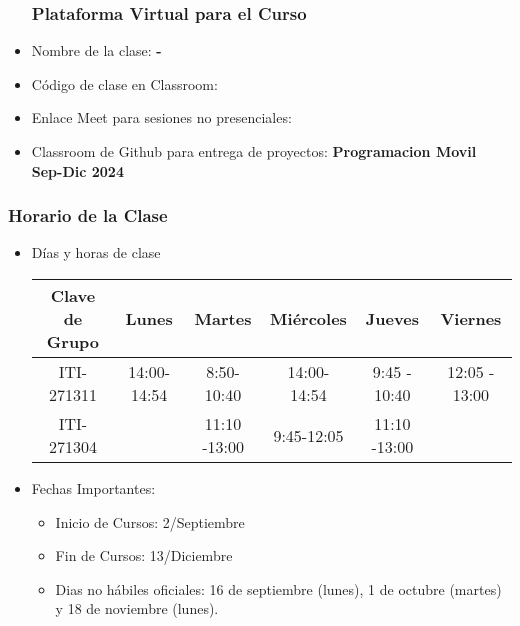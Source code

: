 



\begin{frame}
\begin{itemize}
\frametitle{Plataforma Virtual para el Curso}
\item Nombre de la clase: \textbf{\nombreMateria - \cuatrimestre}
\item Código de clase en Classroom: \textbf{\claveClassroom}
\item Enlace Meet para sesiones no presenciales: \textbf{\claveMeet}
\item Classroom de Github para entrega de proyectos: \textbf{Programacion Movil Sep-Dic 2024}
\end{itemize}

\end{frame}


\begin{frame}
\frametitle{Horario de la Clase}


\begin{itemize}
\item Días y horas de clase
\tiny
\begin{spacing}{1.0}
\begin{center}
\begin{tabular}{c|ccccc}
\hline 
\textbf{Clave de Grupo}   & Lunes        & Martes       & Miércoles    & Jueves         & Viernes         \\  \hline 
ITI-271311                & 14:00- 14:54 &  8:50- 10:40 & 14:00-14:54  &  9:45 - 10:40  & 12:05 - 13:00  \\
ITI-271304                &              & 11:10 -13:00 &  9:45-12:05  &  11:10 -13:00  &                \\      
\hline
\end{tabular}
\end{center}
\end{spacing}
\normalsize
\item Fechas Importantes:
\begin{itemize}
\item Inicio de Cursos: 2/Septiembre
\item Fin de Cursos: 13/Diciembre
\item Dias no hábiles oficiales: 16 de septiembre (lunes), 1 de octubre (martes) y 18 de noviembre (lunes).
\end{itemize}
\end{itemize}

\end{frame}


